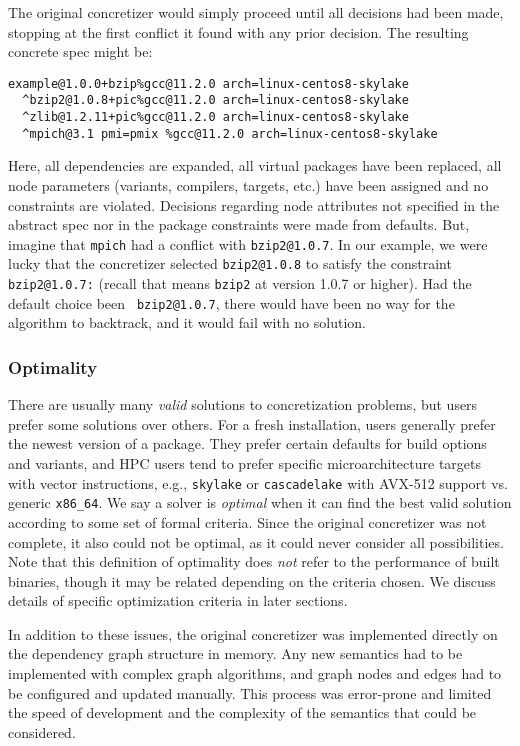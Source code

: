 The original concretizer would simply proceed until all decisions had been made,
stopping at the first conflict it found with any prior decision. The
resulting concrete spec might be:
\begin{verbatim}
example@1.0.0+bzip%gcc@11.2.0 arch=linux-centos8-skylake
  ^bzip2@1.0.8+pic%gcc@11.2.0 arch=linux-centos8-skylake
  ^zlib@1.2.11+pic%gcc@11.2.0 arch=linux-centos8-skylake
  ^mpich@3.1 pmi=pmix %gcc@11.2.0 arch=linux-centos8-skylake
\end{verbatim}
Here, all dependencies are expanded, all virtual packages have been replaced, all node
parameters (variants, compilers, targets, etc.) have been assigned and no constraints
are violated. Decisions regarding node attributes not specified in the abstract spec nor
in the package constraints were made from defaults. But, imagine that {\tt mpich} had a
conflict with {\tt bzip2@1.0.7}. In our example, we were lucky that the concretizer
selected {\tt bzip2@1.0.8} to satisfy the constraint {\tt bzip2@1.0.7:} (recall that
means \texttt{bzip2} at version 1.0.7 or higher). Had the default choice been {\tt
  bzip2@1.0.7}, there would have been no way for the algorithm to backtrack, and it would
fail with no solution.

\subsubsection{Optimality}
There are usually many {\it valid} solutions to concretization problems, but users
prefer some solutions over others. For a fresh installation, users generally prefer the
newest version of a package. They prefer certain defaults for build options and
variants, and HPC users tend to prefer specific microarchitecture targets with vector
instructions, e.g., {\tt skylake} or {\tt cascadelake} with AVX-512 support vs. generic
{\tt x86\_64}. We say a solver is {\it optimal} when it can find the best valid solution
according to some set of formal criteria. Since the original concretizer was not
complete, it also could not be optimal, as it could never consider all possibilities.
Note that this definition of optimality does {\it not} refer to the performance of built
binaries, though it may be related depending on the criteria chosen. We discuss details
of specific optimization criteria in later sections.

In addition to these issues, the original concretizer was implemented directly on the
dependency graph structure in memory. Any new semantics had to be implemented with
complex graph algorithms, and graph nodes and edges had to be configured and updated
manually. This process was error-prone and limited the speed of development and the
complexity of the semantics that could be considered.
